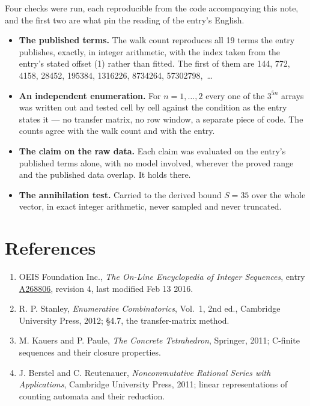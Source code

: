 \documentclass[11pt]{article}
\theoremstyle{definition}
\begin{document}
Four checks were run, each reproducible from the code accompanying this note, and the first two are what pin the reading of the entry's English.

\begin{itemize}

\item {\bfseries The published terms.} The walk count reproduces all 19 terms the entry publishes, exactly, in integer arithmetic, with the index taken from the entry's stated offset (1) rather than fitted. The first of them are 144, 772, 4158, 28452, 195384, 1316226, 8734264, 57302798,~\dots

\item {\bfseries An independent enumeration.} For $n = 1,\dots,2$ every one of the $3^{5n}$ arrays was written out and tested cell by cell against the condition as the entry states it --- no transfer matrix, no row window, a separate piece of code. The counts agree with the walk count and with the entry.

\item {\bfseries The claim on the raw data.} Each claim was evaluated on the entry's published terms alone, with no model involved, wherever the proved range and the published data overlap. It holds there.

\item {\bfseries The annihilation test.} Carried to the derived bound $S = 35$ over the whole vector, in exact integer arithmetic, never sampled and never truncated.

\end{itemize}

\section{References}

\begin{enumerate}

\item OEIS Foundation Inc., \emph{The On-Line Encyclopedia of Integer Sequences}, entry \href{https://oeis.org/A268806}{A268806}, revision 4, last modified Feb 13 2016.

\item R. P. Stanley, \emph{Enumerative Combinatorics}, Vol.~1, 2nd ed., Cambridge University Press, 2012; \S4.7, the transfer-matrix method.

\item M. Kauers and P. Paule, \emph{The Concrete Tetrahedron}, Springer, 2011; C-finite sequences and their closure properties.

\item J. Berstel and C. Reutenauer, \emph{Noncommutative Rational Series with Applications}, Cambridge University Press, 2011; linear representations of counting automata and their reduction.

\end{enumerate}
\end{document}

